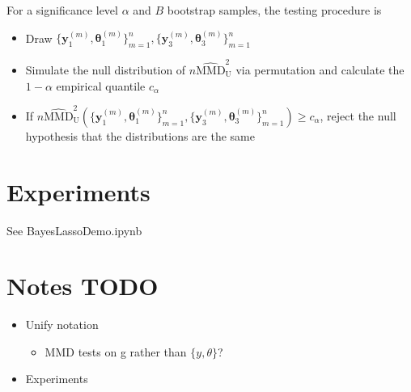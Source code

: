 \documentclass{article}
\begin{document}
For a significance level $\alpha$ and $B$ bootstrap samples, the testing procedure is
\begin{itemize}
    \item Draw $\{\mathbf{y}_{1}^{(m)}, \mathbf{\theta}_{1}^{(m)}\}_{m=1}^{n}, \{\mathbf{y}_{3}^{(m)}, \mathbf{\theta}_{3}^{(m)}\}_{m=1}^{n}$
    \item Simulate the null distribution of $n\widehat{\mathrm{MMD}}_{\mathrm{U}}^{2}$ via permutation and calculate the $1-\alpha$ empirical quantile $c_{\alpha}$
    \item If $n\widehat{\mathrm{MMD}}_{\mathrm{U}}^{2}(\{\mathbf{y}_{1}^{(m)}, \mathbf{\theta}_{1}^{(m)}\}_{m=1}^{n}, \{\mathbf{y}_{3}^{(m)}, \mathbf{\theta}_{3}^{(m)}\}_{m=1}^{n}) \geq c_{\alpha}$, reject the null hypothesis that the distributions are the same
\end{itemize}

\section{Experiments}
See BayesLassoDemo.ipynb

\section{Notes TODO}
\begin{itemize}
    \item Unify notation
    \begin{itemize}
        \item MMD tests on g rather than $\{y, \theta\}$?
    \end{itemize}
    \item Experiments
\end{itemize}
\end{document}
